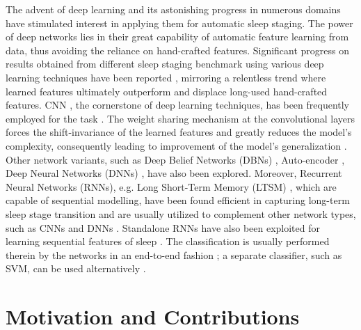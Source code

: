 \documentclass[10pt,twocolumn,twoside]{IEEEtran}
\begin{document}
The advent of deep learning and its astonishing progress in numerous domains have stimulated interest in applying them for automatic sleep staging. The power of deep networks lies in their great capability of automatic feature learning from data, thus avoiding the reliance on hand-crafted features. Significant progress on results obtained from different sleep staging benchmark using various deep learning techniques have been reported \cite{Stephansen2017, Mikkelsen2018, Zhang2017, Tsinalis2016, Tsinalis2016b, Supratak2017, Dong2017, Phan2018c, Phan2018d}, mirroring a relentless trend where learned features ultimately outperform and displace long-used hand-crafted features. CNN \cite{LeCun2015,Lecun1989}, the cornerstone of deep learning techniques, has been frequently employed for the task \cite{Mikkelsen2018, Zhang2017, Tsinalis2016}. The weight sharing mechanism at the convolutional layers forces the shift-invariance of the learned features and greatly reduces the model's complexity, consequently leading to improvement of the model's generalization \cite{LeCun2015}. Other network variants, such as Deep Belief Networks (DBNs) \cite{Laengkvist2012}, Auto-encoder \cite{Tsinalis2016b}, Deep Neural Networks (DNNs) \cite{Dong2017}, have also been explored. Moreover, Recurrent Neural Networks (RNNs), e.g. Long Short-Term Memory (LTSM) \cite{Hochreiter1997}, which are capable of sequential modelling, have been found efficient in capturing long-term sleep stage transition and are usually utilized to complement other network types, such as CNNs \cite{Supratak2017,Stephansen2017} and DNNs \cite{Dong2017}. Standalone RNNs have also been exploited for learning sequential features of sleep \cite{Phan2018d,Koch2018a,Koch2018b}. The classification is usually performed therein by the networks in an end-to-end fashion \cite{Mikkelsen2018, Zhang2017, Tsinalis2016}; a separate classifier, such as SVM, can be used alternatively \cite{Phan2018d,Ansari2018}.

\section{Motivation and Contributions}
\end{document}
